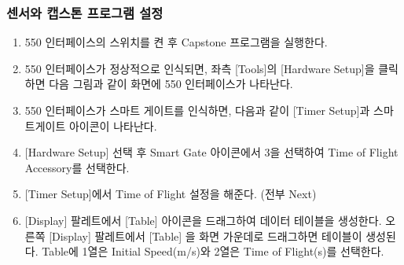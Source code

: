 \documentclass[12pt,a4paper]{article}
\begin{document}
\subsubsection{센서와 캡스톤 프로그램 설정}
\begin{enumerate}
    \item 550 인터페이스의 스위치를 켠 후 Capstone 프로그램을 실행한다.
    \item 550 인터페이스가 정상적으로 인식되면, 좌측 [Tools]의 [Hardware Setup]을 클릭하면 다음 그림과 같이 화면에 550
    인터페이스가 나타난다.
    \item 550 인터페이스가 스마트 게이트를 인식하면, 다음과 같이 [Timer Setup]과 스마트게이트 아이콘이 나타난다.
    \item {[Hardware Setup]} 선택 후 Smart Gate 아이콘에서 3을 선택하여 Time of Flight Accessory를 선택한다.
    \item {[Timer Setup]}에서 Time of Flight 설정을 해준다. (전부 Next)
    \item {[Display]} 팔레트에서 [Table] 아이콘을 드래그하여 데이터 테이블을 생성한다. 오른쪽 [Display] 팔레트에서 [Table]
    을 화면 가운데로 드래그하면 테이블이 생성된다. Table에 1열은 Initial Speed(m/s)와 2열은 Time of Flight(s)를 선택한다.
\end{enumerate}
\end{document}
